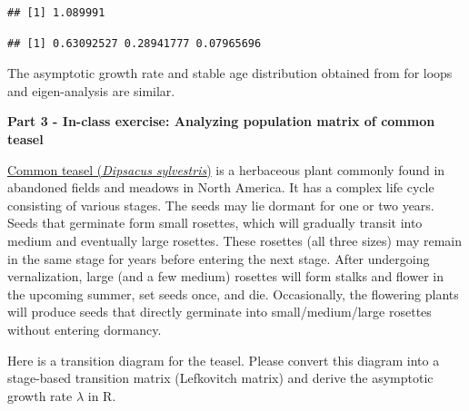 \documentclass[
]{book}
\newenvironment{Shaded}{\begin{snugshade}}{\end{snugshade}}
\newcommand{\CommentTok}[1]{\textcolor[rgb]{0.56,0.35,0.01}{\textit{#1}}}
\newcommand{\DecValTok}[1]{\textcolor[rgb]{0.00,0.00,0.81}{#1}}
\newcommand{\FunctionTok}[1]{\textcolor[rgb]{0.13,0.29,0.53}{\textbf{#1}}}
\newcommand{\NormalTok}[1]{#1}
\newcommand{\SpecialCharTok}[1]{\textcolor[rgb]{0.81,0.36,0.00}{\textbf{#1}}}
\begin{document}
\begin{verbatim}
## [1] 1.089991
\end{verbatim}

\begin{Shaded}
\end{Shaded}

\begin{verbatim}
## [1] 0.63092527 0.28941777 0.07965696
\end{verbatim}

The asymptotic growth rate and stable age distribution obtained from for loops and eigen-analysis are similar.

\textbf{Part 3 - In-class exercise: Analyzing population matrix of common teasel}

\href{https://en.wikipedia.org/wiki/Dipsacus_fullonum}{Common teasel (\emph{Dipsacus sylvestris})} is a herbaceous plant commonly found in abandoned fields and meadows in North America. It has a complex life cycle consisting of various stages. The seeds may lie dormant for one or two years. Seeds that germinate form small rosettes, which will gradually transit into medium and eventually large rosettes. These rosettes (all three sizes) may remain in the same stage for years before entering the next stage. After undergoing vernalization, large (and a few medium) rosettes will form stalks and flower in the upcoming summer, set seeds once, and die. Occasionally, the flowering plants will produce seeds that directly germinate into small/medium/large rosettes without entering dormancy.

Here is a transition diagram for the teasel. Please convert this diagram into a stage-based transition matrix (Lefkovitch matrix) and derive the asymptotic growth rate \(\lambda\) in R.
\end{document}
